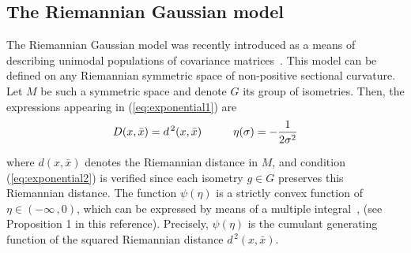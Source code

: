 \documentclass{svmult}
\begin{document}
\subsection{The Riemannian Gaussian model} \label{subsec:gauss}
The Riemannian Gaussian model was recently introduced as a means of describing unimodal populations of covariance matrices~\cite{vemuri,said1,said2}. This model can be defined on any Riemannian symmetric space of non-positive sectional curvature. Let $M$ be such a symmetric space and denote $G$ its group of isometries. Then, the expressions appearing in (\ref{eq:exponential1}) are
\begin{equation} \label{eq:rgm}
   D(x,\bar{x}) = d^{\,2}(x,\bar{x}) \hspace{1cm} \eta(\sigma) = -\frac{1}{\strut 2\sigma^2}%
\end{equation}
where $d(x,\bar{x})$ denotes the Riemannian distance in $M$, and condition (\ref{eq:exponential2}) is verified since each isometry $g \in G$ preserves this Riemannian distance. The function $\psi(\eta)$ is a strictly convex function of $\eta \in (-\infty\,,0)$, which can be expressed by means of a multiple integral~\cite{said2}, (see Proposition 1 in this reference). Precisely, $\psi(\eta)$ is the cumulant generating function of the squared Riemannian distance $d^{\,2}(x,\bar{x})$. 
\end{document}
